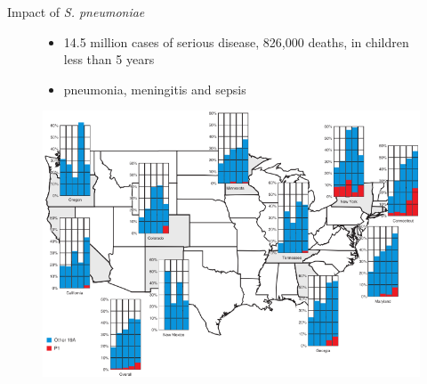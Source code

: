 \documentclass{beamer}
\begin{document}
\begin{frame}{Impact of \textit{S. pneumoniae}}
\begin{figure}
\begin{itemize}
\item 14.5 million cases of serious disease, 826,000 deaths, in children less than 5 years
\item pneumonia, meningitis and sepsis
\end{itemize}
\end{figure}
\begin{figure}
\includegraphics[width=0.6\linewidth]{images/spread-of-p1.png}\\
\hspace*{11pt}\hbox{\scriptsize {}}
\end{figure}
\end{frame}
\end{document}
